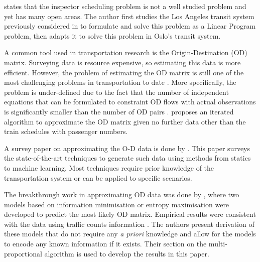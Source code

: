 \documentclass[11pt]{article}
\begin{document}
\citet{mastersthesis} states that the inspector scheduling problem is not a well studied problem and yet has many open areas. The author first studies the Los Angeles transit system previously considered in \cite{jiang_sandholm_2012, yin_sullivan_2012} to formulate and solve this problem as a Linear Program problem, then adapts it to solve this problem in Oslo's transit system.

A common tool used in transportation research is the Origin-Destination (OD) matrix. 
Surveying data is resource expensive, so estimating this data 
is more efficient. However, the problem
of estimating the OD matrix is still one of the most challenging problems
in transportation to date \cite{KRISHNAKUMARI2019}. More specifically, the problem is under-defined 
due to the fact that the number of independent equations that can be formulated to constraint 
OD flows with actual observations is significantly smaller than the number of OD pairs
\cite{KRISHNAKUMARI2019}.  \citet{caceres_romero_benitez_2011} proposes an 
iterated algorithm to approximate the OD matrix given
no further data other than the train schedules with passenger numbers.

A survey paper on approximating the O-D data is done by \citet{bera_krishna_rao}. This paper surveys the state-of-the-art techniques to generate such data using methods from statics to machine learning. Most techniques require prior knowledge of the transportation system or can be applied to specific scenarios.

The breakthrough work in approximating OD data was done by
\citet{van_zuylen_willumsen_1980}, where two models based on
information minimisation or entropy maximisation were developed
to predict the most likely OD matrix.
Empirical results were consistent with the data using traffic counts information 
\cite{van_zuylen_willumsen_1980}. The authors present derivation of these models that do not require any \textit{a priori} knowledge and allow for the models to encode any known information if it exists. Their section on the multi-proportional algorithm is used to develop the results in this paper.
\end{document}
